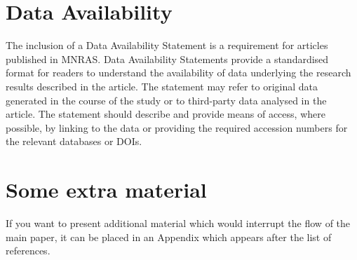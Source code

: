 \documentclass[fleqn,usenatbib]{mnras}
\begin{document}
\section*{Data Availability}

 
The inclusion of a Data Availability Statement is a requirement for articles published in MNRAS. Data Availability Statements provide a standardised format for readers to understand the availability of data underlying the research results described in the article. The statement may refer to original data generated in the course of the study or to third-party data analysed in the article. The statement should describe and provide means of access, where possible, by linking to the data or providing the required accession numbers for the relevant databases or DOIs.










\appendix

\section{Some extra material}

If you want to present additional material which would interrupt the flow of the main paper,
it can be placed in an Appendix which appears after the list of references.



\bsp	%
\label{lastpage}
\end{document}
